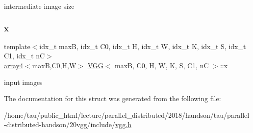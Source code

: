intermediate image size \mbox{\label{structVGG_ab352e8c1793b749d92b85e75ca4f66e8}} 
\subsubsection{\texorpdfstring{x}{x}}
{\footnotesize\ttfamily template$<$idx\+\_\+t maxB, idx\+\_\+t C0, idx\+\_\+t H, idx\+\_\+t W, idx\+\_\+t K, idx\+\_\+t S, idx\+\_\+t C1, idx\+\_\+t nC$>$ \\
\hyperlink{structarray4}{array4}$<$maxB,C0,H,W$>$ \hyperlink{structVGG}{V\+GG}$<$ maxB, C0, H, W, K, S, C1, nC $>$\+::x}

input images 

The documentation for this struct was generated from the following file\+:\begin{DoxyCompactItemize}
\item 
/home/tau/public\+\_\+html/lecture/parallel\+\_\+distributed/2018/handson/tau/parallel-\/distributed-\/handson/20vgg/include/\hyperlink{vgg_8h}{vgg.\+h}\end{DoxyCompactItemize}
